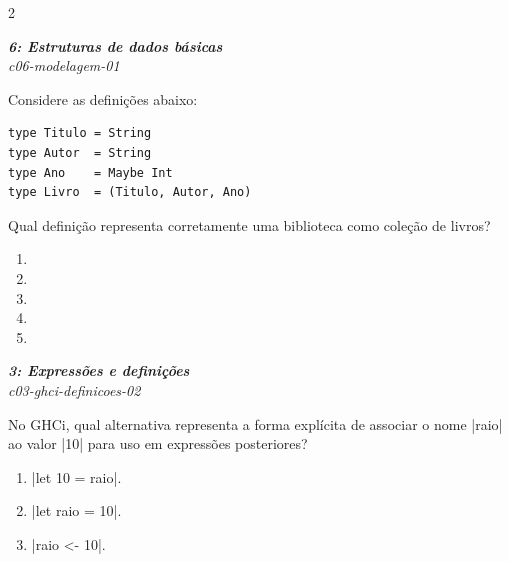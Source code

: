 \documentclass[a4paper,10pt,brazil]{article}
\begin{document}
\begin{multicols}{2}
\begin{enumerate}
\end{enumerate}

\begin{flushright}
  \footnotesize
  \textit{\textbf{6: Estruturas de dados básicas}}\\
  \textit{c06-modelagem-01}\\

\end{flushright}
Considere as definições abaixo:
\begin{verbatim}
type Titulo = String
type Autor  = String
type Ano    = Maybe Int
type Livro  = (Titulo, Autor, Ano)
\end{verbatim}
Qual definição representa corretamente uma biblioteca como coleção de livros?

\begin{enumerate}
  \item {}

  \item {}

  \item {}

  \item {}

  \item {}


\end{enumerate}

\begin{flushright}
  \footnotesize
  \textit{\textbf{3: Expressões e definições}}\\
  \textit{c03-ghci-definicoes-02}\\

\end{flushright}
No GHCi, qual alternativa representa a forma explícita de associar o nome \haskellinline|raio| ao valor \haskellinline|10| para uso em expressões posteriores?

\begin{enumerate}
  \item \haskellinline|let 10 = raio|.

  \item \haskellinline|let raio = 10|.

  \item \haskellinline|raio <- 10|.


\end{enumerate}
\end{multicols}
\end{document}
